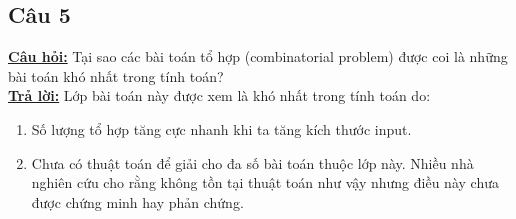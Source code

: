 \documentclass[14pt]{extarticle}
\begin{document}
\begin{flushleft}
	\subsection{Câu 5}
		\underline{\textbf{Câu hỏi:}} Tại sao các bài toán tổ hợp (combinatorial problem) được coi là những bài toán khó nhất trong tính toán? \\
		\underline{\textbf{Trả lời:}} Lớp bài toán này được xem là khó nhất trong tính toán do: \\
		\begin{enumerate}
			\item Số lượng tổ hợp tăng cực nhanh khi ta tăng kích thước input.
			\item Chưa có thuật toán để giải cho đa số bài toán thuộc lớp này. Nhiều nhà nghiên cứu cho rằng không tồn tại thuật toán như vậy nhưng điều này chưa được chứng minh hay phản chứng.
			
		\end{enumerate}
\end{flushleft}
\end{document}
